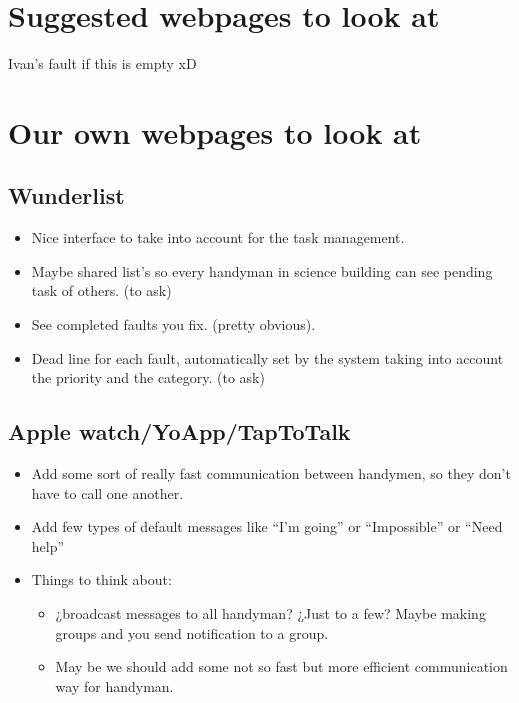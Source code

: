 \section{Suggested webpages to look at}

Ivan's fault if this is empty xD

\section{Our own webpages to look at}

\subsection{Wunderlist}

\begin{itemize}
\item Nice interface to take into account for the task management.
\item Maybe shared list's so every handyman in science building can see pending task of others. (to ask)
\item See completed faults you fix. (pretty obvious).
\item Dead line for each fault, automatically set by the system taking into account the priority and the category. (to ask)
\end{itemize}


\subsection{Apple watch/YoApp/TapToTalk}

\begin{itemize}
\item Add some sort of really fast communication between handymen, so they don't have to call one another.
\item Add few types of default messages like “I'm going” or “Impossible” or “Need help”
\item Things to think about:
\begin{itemize}\label{AppleWatch}
\item ¿broadcast messages to all handyman? ¿Just to a few? Maybe making groups and you send notification to a group.
\item May be we should add some not so fast but more efficient communication way for handyman.
\end{itemize}
\end{itemize}


